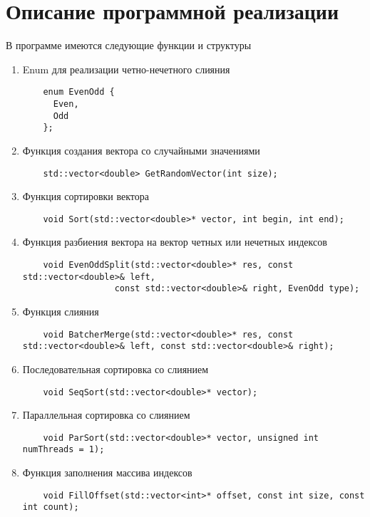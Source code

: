 \documentclass{report}
\begin{document}
\section*{Описание программной реализации}
В программе имеются следующие функции и структуры
\begin{enumerate}

\item Enum для реализации четно-нечетного слияния
\begin{lstlisting}
	enum EvenOdd {
	  Even,
	  Odd
	};
\end{lstlisting}
\item Функция создания вектора со случайными значениями
\begin{lstlisting}
	std::vector<double> GetRandomVector(int size);
\end{lstlisting}

\item Функция сортировки вектора
\begin{lstlisting}
	void Sort(std::vector<double>* vector, int begin, int end);
\end{lstlisting}

\item Функция разбиения вектора на вектор четных или нечетных индексов
\begin{lstlisting}
	void EvenOddSplit(std::vector<double>* res, const std::vector<double>& left,
                  const std::vector<double>& right, EvenOdd type);
\end{lstlisting}

\item Функция слияния
\begin{lstlisting}
	void BatcherMerge(std::vector<double>* res, const std::vector<double>& left, const std::vector<double>& right);
\end{lstlisting}

\item Последовательная сортировка со слиянием
\begin{lstlisting}
	void SeqSort(std::vector<double>* vector);
\end{lstlisting}

\item Параллельная сортировка со слиянием
\begin{lstlisting}
	void ParSort(std::vector<double>* vector, unsigned int numThreads = 1);
\end{lstlisting}

\item Функция заполнения массива индексов
\begin{lstlisting}
	void FillOffset(std::vector<int>* offset, const int size, const int count);
\end{lstlisting}


\end{enumerate}
\end{document}
